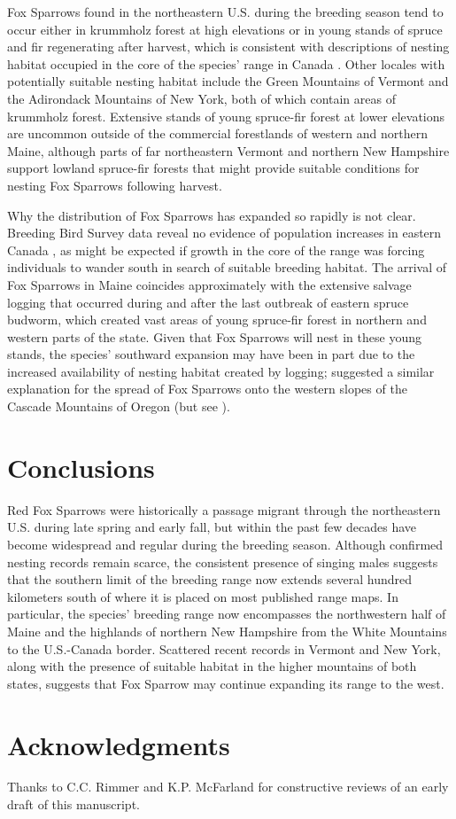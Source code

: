 \documentclass[fleqn,10pt,lineno]{wlpeerj} %
\begin{document}
Fox Sparrows found in the northeastern U.S. during the breeding season tend to occur either in krummholz forest at high elevations or in young stands of spruce and fir regenerating after harvest, which is consistent with descriptions of nesting habitat occupied in the core of the species’ range in Canada \citep{Weckstein2002-px}. Other locales with potentially suitable nesting habitat include the Green Mountains of Vermont and the Adirondack Mountains of New York, both of which contain areas of krummholz forest. Extensive stands of young spruce-fir forest at lower elevations are uncommon outside of the commercial forestlands of western and northern Maine, although parts of far northeastern Vermont and northern New Hampshire support lowland spruce-fir forests that might provide suitable conditions for nesting Fox Sparrows following harvest.

Why the distribution of Fox Sparrows has expanded so rapidly is not clear. Breeding Bird Survey data reveal no evidence of population increases in eastern Canada \citep{Environment_and_Climate_Change_Canada2017-hp}, as might be expected if growth in the core of the range was forcing individuals to wander south in search of suitable breeding habitat. The arrival of Fox Sparrows in Maine coincides approximately with the extensive salvage logging that occurred during and after the last outbreak of eastern spruce budworm, which created vast areas of young spruce-fir forest in northern and western parts of the state. Given that Fox Sparrows will nest in these young stands, the species’ southward expansion may have been in part due to the increased availability of nesting habitat created by logging; \cite{Banks1970-rh} suggested a similar explanation for the spread of Fox Sparrows onto the western slopes of the Cascade Mountains of Oregon (but see \cite{Marshall2003-om}). 

\section*{Conclusions}
Red Fox Sparrows were historically a passage migrant through the northeastern U.S. during late spring and early fall, but within the past few decades have become widespread and regular during the breeding season. Although confirmed nesting records remain scarce, the consistent presence of singing males suggests that the southern limit of the breeding range now extends several hundred kilometers south of where it is placed on most published range maps. In particular, the species’ breeding range now encompasses the northwestern half of Maine and the highlands of northern New Hampshire from the White Mountains to the U.S.-Canada border. Scattered recent records in Vermont and New York, along with the presence of suitable habitat in the higher mountains of both states, suggests that Fox Sparrow may continue expanding its range to the west.

\section*{Acknowledgments}

Thanks to C.C. Rimmer and K.P. McFarland for constructive reviews of an early draft of this manuscript.


\end{document}
